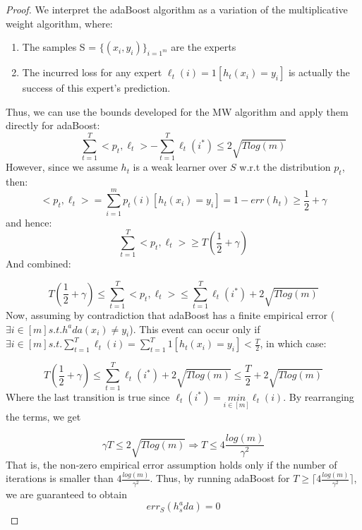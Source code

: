 \begin{proof}    
    We interpret the adaBoost algorithm as a variation of the multiplicative weight algorithm, where:
    \begin{enumerate}
        \item The samples S = $\{(x_i, y_i)\}_{i=1^m}$ are the experts
        \item The incurred loss for any expert $\ell_t(i) = 1[h_t(x_i) = y_i]$ is actually the success of this expert's prediction.
    \end{enumerate}
    Thus, we can use the bounds developed for the MW algorithm and apply them directly for adaBoost:
    \begin{equation*}
        \sum_{t=1}^T <p_t, \ell_t> - \sum_{t=1}^T \ell_t(i^*) \leq 2\sqrt{T log(m)}
    \end{equation*}
    However, since we assume $h_t$ is a weak learner over $S$ w.r.t the distribution $p_t$, then:
    \begin{equation*}
        <p_t, \ell_t> = \sum_{i=1}^m p_t(i) [h_t(x_i) = y_i] = 1 - err(h_t) \geq \frac{1}{2} + \gamma
    \end{equation*}
    and hence:
    \begin{equation*}
        \sum_{t=1}^T <p_t, \ell_t> \geq T(\frac{1}{2} + \gamma)
    \end{equation*}
    And combined:
    
    \begin{equation*}
        T(\frac{1}{2} + \gamma) \leq \sum_{t=1}^T <p_t, \ell_t> \leq \sum_{t=1}^T \ell_t(i^*) + 2\sqrt{T log(m)}
    \end{equation*}
    Now, assuming by contradiction that adaBoost has a finite empirical error ($\exists i\in [m] s.t. h^ada(x_i) \neq y_i$).
    This event can occur only if $\exists i\in [m] s.t. \sum_{t=1}^T \ell_t(i) = \sum_{t=1}^T 1[h_t(x_i) = y_i]  < \frac{T}{2}$, in which case:
    
    \begin{equation*}
        T(\frac{1}{2} + \gamma) \leq \sum_{t=1}^T \ell_t(i^*) + 2\sqrt{T log(m)} \leq \frac{T}{2} + 2\sqrt{T log(m)}
    \end{equation*}
    Where the last transition is true since $\ell_t(i^*) = \underset{i\in [m]}{min} \ell_t(i)$.
    By rearranging the terms, we get
    
    \begin{equation*}
        \gamma T \leq 2\sqrt{T log(m)} \Rightarrow T \leq 4\frac{log(m)}{\gamma^2}
    \end{equation*}
    That is, the non-zero empirical error assumption holds only if the number of iterations is smaller than $4\frac{log(m)}{\gamma^2}$. Thus, by running adaBoost for $T \geq \lceil 4\frac{log(m)}{\gamma^2} \rceil$, we are guaranteed to obtain
    \begin{equation*}
        err_S(h_s^ada) = 0
    \end{equation*}
\end{proof}